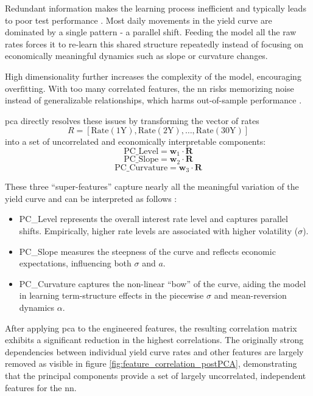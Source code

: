 Redundant information makes the learning process inefficient and typically leads to poor test performance \parencite[p.~3]{sildir2020redudantfeatures}. Most daily movements in the yield curve are dominated by a single pattern - a parallel shift. Feeding the model all the raw rates forces it to re-learn this shared structure repeatedly instead of focusing on economically meaningful dynamics such as slope or curvature changes.

High dimensionality further increases the complexity of the model, encouraging overfitting. With too many correlated features, the \ac{nn} risks memorizing noise instead of generalizable relationships, which harms out-of-sample performance \parencite[p.~3]{sildir2020redudantfeatures}.

\ac{pca} directly resolves these issues by transforming the vector of rates
\[
	R = [\text{Rate}(1\text{Y}), \text{Rate}(2\text{Y}), \dots, \text{Rate}(30\text{Y})]
\]
into a set of uncorrelated and economically interpretable components:
\begin{equation}
	\text{PC\_Level} = \mathbf{w}_1 \cdot \mathbf{R}
\end{equation}
\begin{equation}
	\text{PC\_Slope} = \mathbf{w}_2 \cdot \mathbf{R}
\end{equation}
\begin{equation}
	\text{PC\_Curvature} = \mathbf{w}_3 \cdot \mathbf{R}
\end{equation}

These three “super-features” capture nearly all the meaningful variation of the yield curve and can be interpreted as follows \parencite[pp.~98--107]{Rebonato_2018}:
\begin{itemize}
	\item PC\_Level represents the overall interest rate level and captures parallel shifts. Empirically, higher rate levels are associated with higher volatility (\(\sigma\)).
	\item PC\_Slope measures the steepness of the curve and reflects economic expectations, influencing both \(\sigma\) and \(a\).
	\item PC\_Curvature captures the non-linear “bow” of the curve, aiding the model in learning term-structure effects in the piecewise $\sigma$ and mean-reversion dynamics $\alpha$.
\end{itemize}

After applying \ac{pca} to the engineered features, the resulting correlation matrix exhibits a significant reduction in the highest correlations. The originally strong dependencies between individual yield curve rates and other features are largely removed as visible in figure \ref{fig:feature_correlation_postPCA}, demonstrating that the principal components provide a set of largely uncorrelated, independent features for the \ac{nn}.

